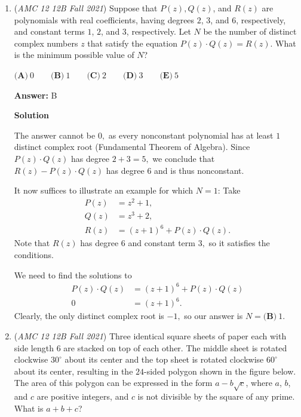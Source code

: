\begin{enumerate}
\textbf{Solution 5 (guess)}

Since we can't calculate the exact value of $\sin{\frac{2\pi}{11}},$ it's unlikely the answer will have radicals in it. This leaves us with $-1, 1,$ and $\frac{10}{11}.$ The fraction is too precise for it to be a likely answer, so that leaves us with $1$ or $-1.$ Note that if the angle is greater than $\pi,$ the sine will be negative, and if it's less than $\pi$ it'll be positive. The numerator and denominator are therefore both positive, so we eliminate $-1$ to get $\boxed{\textbf{(E)}\ 1}.$



	\item (\textit{AMC 12 12B Fall 2021}) Suppose that $P(z), Q(z)$, and $R(z)$ are polynomials with real coefficients, having degrees $2$, $3$, and $6$, respectively, and constant terms $1$, $2$, and $3$, respectively. Let $N$ be the number of distinct complex numbers $z$ that satisfy the equation $P(z) \cdot Q(z)=R(z)$. What is the minimum possible value of $N$?


 $\textbf{(A)}\: 0\qquad\textbf{(B)} \: 1\qquad\textbf{(C)} \: 2\qquad\textbf{(D)} \: 3\qquad\textbf{(E)} \: 5$

 \textbf{Answer: }B



\textbf{Solution}

The answer cannot be $0,$ as every nonconstant polynomial has at least $1$ distinct complex root (Fundamental Theorem of Algebra). Since $P(z) \cdot Q(z)$ has degree $2 + 3 = 5,$ we conclude that $R(z) - P(z)\cdot Q(z)$ has degree $6$ and is thus nonconstant.

 It now suffices to illustrate an example for which $N = 1$: Take
 \begin{align*} P(z)&=z^2+1, \\ Q(z)&=z^3+2, \\ R(z)&=(z+1)^6 + P(z) \cdot Q(z). \end{align*}
Note that $R(z)$ has degree $6$ and constant term $3,$ so it satisfies the conditions.

 We need to find the solutions to 
 \begin{align*} P(z) \cdot Q(z) &= (z+1)^6 + P(z) \cdot Q(z) \\ 0 &= (z+1)^6. \end{align*}
Clearly, the only distinct complex root is $-1,$ so our answer is $N=\boxed{\textbf{(B)} \: 1}.$



	\item (\textit{AMC 12 12B Fall 2021}) Three identical square sheets of paper each with side length $6$ are stacked on top of each other. The middle sheet is rotated clockwise $30^\circ$ about its center and the top sheet is rotated clockwise $60^\circ$ about its center, resulting in the $24$-sided polygon shown in the figure below. The area of this polygon can be expressed in the form $a-b\sqrt{c}$, where $a$, $b$, and $c$ are positive integers, and $c$ is not divisible by the square of any prime. What is $a+b+c$?



\end{enumerate}
